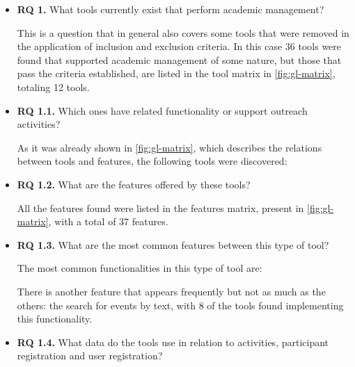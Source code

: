 \begin{itemize}
  \item \textbf{RQ 1.} What tools currently exist that perform academic management?

        This is a question that in general also covers some tools that were removed in the application of inclusion and exclusion criteria. In this case 36 tools were found that supported academic management of some nature, but those that pass the criteria established, are listed in the tool matrix in \autoref{fig:gl-matrix}, totaling 12 tools.
  \item \textbf{RQ 1.1.} Which ones have related functionality or support outreach activities?

        As it was already shown in \autoref{fig:gl-matrix}, which describes the relations between tools and features, the following tools were discovered:

  \item \textbf{RQ 1.2.} What are the features offered by these tools?

        All the features found were listed in the features matrix, present in \autoref{fig:gl-matrix}, with a total of 37 features.
  \item \textbf{RQ 1.3.} What are the most common features between this type of tool?

        The most common functionalities in this type of tool are:
        There is another feature that appears frequently but not as much as the others: the search for events by text, with 8 of the tools found implementing this functionality.
  \item \textbf{RQ 1.4.} What data do the tools use in relation to activities, participant registration and user registration?


\end{itemize}
